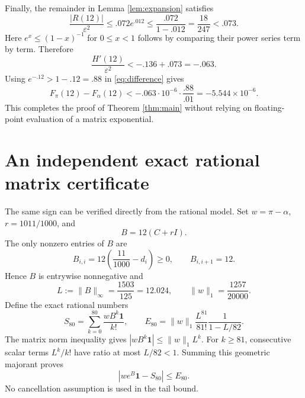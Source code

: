 \documentclass[11pt]{article}
\newcommand{\one}{\mathbf 1}
\begin{document}
Finally, the remainder in Lemma \ref{lem:expansion} satisfies
\[
 \frac{|R(12)|}{\varepsilon^2}
 \leq .072e^{.012}
 \leq\frac{.072}{1-.012}
 =\frac{18}{247}<.073.
\]
Here $e^x\leq(1-x)^{-1}$ for $0\leq x<1$ follows by comparing their
power series term by term. Therefore
\begin{equation}\label{eq:Hnegative}
 \frac{H'(12)}{\varepsilon^2}<-.136+.073=-.063.
\end{equation}
Using $e^{-.12}>1-.12=.88$ in \eqref{eq:difference} gives
\[
 F_\pi(12)-F_\alpha(12)
 <-.063\cdot10^{-6}\cdot\frac{.88}{.01}
 =-5.544\times10^{-6}.
\]
This completes the proof of Theorem \ref{thm:main} without relying
on floating-point evaluation of a matrix exponential.

\section{An independent exact rational matrix certificate}
The same sign can be verified directly from the rational model.
Set $w=\pi-\alpha$, $r=1011/1000$, and
\[
 B=12(C+rI).
\]
The only nonzero entries of $B$ are
\[
 B_{i,i}=12\left(\frac{11}{1000}-d_i\right)\geq0,
 \qquad B_{i,i+1}=12.
\]
Hence $B$ is entrywise nonnegative and
\[
 L:=\|B\|_\infty=\frac{1503}{125}=12.024,
 \qquad\|w\|_1=\frac{1257}{20000}.
\]
Define the exact rational numbers
\begin{equation}\label{eq:series}
 S_{80}=\sum_{k=0}^{80}\frac{wB^k\one}{k!},\qquad
 E_{80}=\|w\|_1\frac{L^{81}}{81!}\frac1{1-L/82}.
\end{equation}
The matrix norm inequality gives
$|wB^k\one|\leq\|w\|_1L^k$. For $k\geq81$, consecutive scalar
terms $L^k/k!$ have ratio at most $L/82<1$. Summing this geometric
majorant proves
\begin{equation}\label{eq:tail}
 |we^B\one-S_{80}|\leq E_{80}.
\end{equation}
No cancellation assumption is used in the tail bound.
\end{document}

